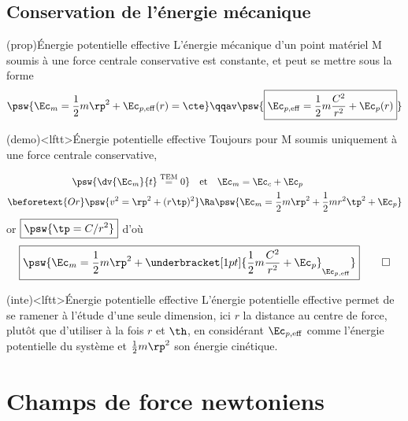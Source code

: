 \documentclass[../../main/main.tex]{subfiles}
\begin{document}
\subsection{Conservation de l'énergie mécanique}

\begin{tcb*}(prop){Énergie potentielle effective}
	L'énergie mécanique d'un point matériel M soumis à une force centrale
	conservative est constante, et peut se mettre sous la forme
	\[
		\psw{
			\Ec_m = \frac{1}{2}m \rp^{2} + \Ec_{p,\rm eff}(r) = \cte
		}
		\qqav
		\psw{
			\boxed{\Ec_{p,\rm eff} = \frac{1}{2}m \frac{C^2}{r^2} + \Ec_p(r)}
		}
	\]
\end{tcb*}

\begin{tcb*}(demo)<lftt>{Énergie potentielle effective}
	Toujours pour M soumis uniquement à une force centrale conservative,
	\smallbreak
	\begin{isd}[righthand ratio=.4]
		\begin{align*}
			\psw{\dv{\Ec_m}{t} \overset{\rm TEM}{=} 0}
			\quad & \text{et} \quad
			\Ec_m = \Ec_c + \Ec_p
			\\
			\beforetext{Or}
			\psw{v^2   = \rp^2 + (r\tp)^2}
			      & \Ra
			\psw{\Ec_m = \frac{1}{2}m\rp^2 + \frac{1}{2}mr^2\tp^2 + \Ec_p}
		\end{align*}
		\tcblower
		or $\boxed{\psw{\tp = C/r^2}}$ d'où
		\begin{gather*}
			\boxed{
				\psw{
					\Ec_m = \frac{1}{2}m\rp^2 +
					\underbracket[1pt]{\frac{1}{2}m \frac{C^2}{r^2}+\Ec_p}_{\Ec_{p,\rm eff}}
				}
			}
			\qed
		\end{gather*}
	\end{isd}
\end{tcb*}

\begin{tcb*}(inte)<lftt>{Énergie potentielle effective}
	L'énergie potentielle effective permet de se ramener à l'étude d'une seule
	dimension, ici $r$ la distance au centre de force, plutôt que d'utiliser à la
	fois $r$ et $\th$, en considérant $\Ec_{p,\rm eff}$ comme l'énergie potentielle
	du système et $\frac{1}{2}m \rp^{2}$ son énergie cinétique.
\end{tcb*}

\section{Champs de force newtoniens}
\end{document}
